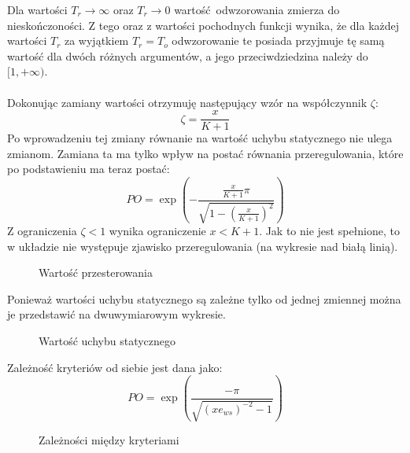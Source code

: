 \documentclass[a4paper, 12pt]{article}
\begin{document}
            Dla wartości $T_r \to \infty$ oraz $T_r \to 0$ wartość odwzorowania zmierza do 
            nieskończoności.  Z tego oraz z wartości pochodnych funkcji wynika, że dla każdej 
            wartości $T_r$ za wyjątkiem $T_r = T_o$ odwzorowanie te posiada przyjmuje tę samą 
            wartość dla dwóch różnych argumentów, a jego przeciwdziedzina należy do $[1, +\infty)$.
            \\ \\
            Dokonując zamiany wartości otrzymuję następujący wzór na współczynnik $\zeta$:
            \begin{equation}
                \zeta = \frac{x}{K+1}
            \end{equation}
            Po wprowadzeniu tej zmiany równanie na wartość uchybu statycznego nie ulega zmianom. Zamiana
            ta ma tylko wpływ na postać równania przeregulowania, które po podstawieniu ma teraz postać:
            \begin{equation}
                PO = \exp\left(
                    - \frac{\frac{x}{K+1} \pi}{\sqrt{1 - \left(\frac{x}{K+1}\right)^2}}
                \right)
                \label{eq:overshoot2}
            \end{equation}
            Z ograniczenia $\zeta < 1$ wynika ograniczenie $x < K + 1$. Jak to nie jest spełnione, 
            to w układzie nie występuje zjawisko przeregulowania (na wykresie nad białą linią).
            \begin{figure}[H]
                \centering
                \def \svgwidth{0.7\columnwidth}
                
                \caption{Wartość przesterowania}
            \end{figure}\noindent
            Ponieważ wartości uchybu statycznego są zależne tylko od jednej zmiennej można je
            przedstawić na dwuwymiarowym wykresie.
            \begin{figure}[H]
                \centering
                \def \svgwidth{0.7\columnwidth}
                
                \caption{Wartość uchybu statycznego}
            \end{figure}\noindent
            Zależność kryteriów od siebie jest dana jako:
            $$
                PO = \exp\left(\frac{-\pi}{\sqrt{(xe_{ws})^{-2} - 1}}\right)
            $$
            \begin{figure}[H]
                \centering
                \def \svgwidth{0.7\columnwidth}
                
                \caption{Zależności między kryteriami}
            \end{figure}\noindent
\end{document}
